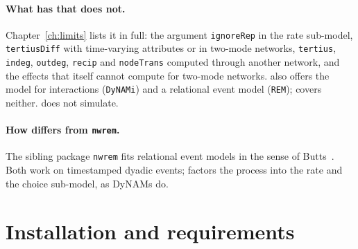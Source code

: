 \paragraph{What \goldfish{} has that \nwdynam{} does not.} Chapter~\ref{ch:limits} lists it in full: the argument \texttt{ignoreRep} in the rate sub-model, \texttt{tertiusDiff} with time-varying attributes or in two-mode networks, \texttt{tertius}, \texttt{indeg}, \texttt{outdeg}, \texttt{recip} and \texttt{nodeTrans} computed through another network, and the effects that \goldfish{} itself cannot compute for two-mode networks. \goldfish{} also offers the model for interactions (\texttt{DyNAMi}) and a relational event model (\texttt{REM}); \nwdynam{} covers neither. \nwdynam{} does not simulate.

\paragraph{How \nwdynam{} differs from \texttt{nwrem}.} The sibling package \texttt{nwrem} fits relational event models in the sense of Butts~\cite{butts2008}. Both work on timestamped dyadic events; \nwdynam{} factors the process into the rate and the choice sub-model, as DyNAMs do.

\section{Installation and requirements}\label{sec:install}

